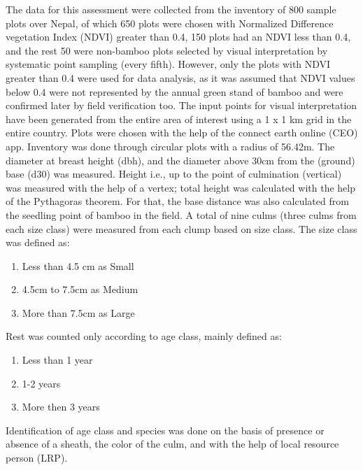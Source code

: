 \documentclass[preprint, 3p,
authoryear]{elsarticle} %
\begin{document}
The data for this assessment were collected from the inventory of 800
sample plots over Nepal, of which 650 plots were chosen with Normalized
Difference vegetation Index (NDVI) greater than 0.4, 150 plots had an
NDVI less than 0.4, and the rest 50 were non-bamboo plots selected by
visual interpretation by systematic point sampling (every fifth).
However, only the plots with NDVI greater than 0.4 were used for data
analysis, as it was assumed that NDVI values below 0.4 were not
represented by the annual green stand of bamboo and were confirmed later
by field verification too. The input points for visual interpretation
have been generated from the entire area of interest using a 1 x 1 km
grid in the entire country. Plots were chosen with the help of the
connect earth online (CEO) app. Inventory was done through circular
plots with a radius of 56.42m. The diameter at breast height (dbh), and
the diameter above 30cm from the (ground) base (d30) was measured.
Height i.e., up to the point of culmination (vertical) was measured with
the help of a vertex; total height was calculated with the help of the
Pythagoras theorem. For that, the base distance was also calculated from
the seedling point of bamboo in the field. A total of nine culms (three
culms from each size class) were measured from each clump based on size
class. The size class was defined as:

\begin{enumerate}
\def\labelenumi{\alph{enumi}.}
\item
  Less than 4.5 cm as Small
\item
  4.5cm to 7.5cm as Medium
\item
  More than 7.5cm as Large
\end{enumerate}

Rest was counted only according to age class, mainly defined as:

\begin{enumerate}
\def\labelenumi{\alph{enumi}.}
\item
  Less than 1 year
\item
  1-2 years
\item
  More then 3 years
\end{enumerate}

Identification of age class and species was done on the basis of
presence or absence of a sheath, the color of the culm, and with the
help of local resource person (LRP).
\end{document}
